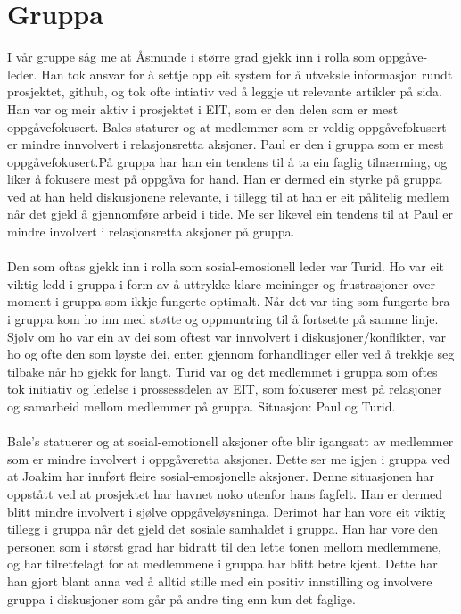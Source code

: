 \section{Gruppa}
I vår gruppe såg me at Åsmunde i større grad gjekk inn i rolla som oppgåve-leder. Han tok ansvar for å settje opp eit system for å utveksle informasjon rundt prosjektet, github, og tok ofte intiativ ved å leggje ut relevante artikler på sida. Han var og meir aktiv i prosjektet i EIT, som er den delen som er mest oppgåvefokusert. 
Bales staturer og at medlemmer som er veldig oppgåvefokusert er mindre innvolvert i relasjonsretta aksjoner. Paul er den i gruppa som er mest oppgåvefokusert.På gruppa har han ein tendens til å ta ein faglig tilnærming, og liker å fokusere mest på oppgåva for hand. Han er dermed ein styrke på gruppa ved at han held diskusjonene relevante, i tillegg til at han er eit pålitelig medlem når det gjeld å gjennomføre arbeid i tide. Me ser likevel ein tendens til at Paul er mindre involvert i relasjonsretta aksjoner på gruppa. 
\\
\\
Den som oftas gjekk inn i rolla som sosial-emosionell leder var Turid. Ho var eit viktig ledd i gruppa i form av å uttrykke klare meininger og frustrasjoner over moment i gruppa som ikkje fungerte optimalt. Når det var ting som fungerte bra i gruppa kom ho inn med støtte og oppmuntring til å fortsette på samme linje. Sjølv om ho var ein av dei som oftest var innvolvert i diskusjoner/konflikter, var ho og ofte den som løyste dei, enten gjennom forhandlinger eller ved å trekkje seg tilbake når ho gjekk for langt. Turid var og det medlemmet i gruppa som oftes tok initiativ og ledelse i prossessdelen av EIT, som fokuserer mest på relasjoner og samarbeid mellom medlemmer på gruppa. 
Situasjon: Paul og Turid.
\\
\\
Bale's statuerer og at sosial-emotionell aksjoner ofte blir igangsatt av medlemmer som er mindre involvert i oppgåveretta aksjoner. Dette ser me igjen i gruppa ved at Joakim har innført fleire sosial-emosjonelle aksjoner. Denne situasjonen har oppstått ved at prosjektet har havnet noko utenfor hans fagfelt. Han er dermed blitt mindre involvert i sjølve oppgåveløysninga. Derimot har han vore eit viktig tillegg i gruppa når det gjeld det sosiale samhaldet i gruppa. Han har vore den personen som i størst grad har bidratt til den lette tonen mellom medlemmene, og har tilrettelagt for at medlemmene i gruppa har blitt betre kjent. Dette har han gjort blant anna ved å alltid stille med ein positiv innstilling og involvere gruppa i diskusjoner som går på andre ting enn kun det faglige.
